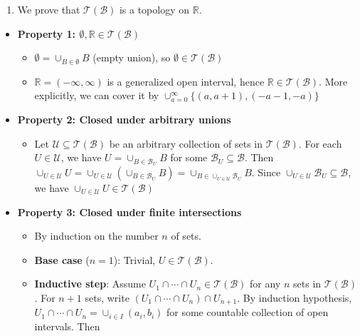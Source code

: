 \documentclass[a4paper,11pt,oneside]{book}
\begin{document}
\begin{mystsolution}\begin{enumerate}
\item We prove that $\mathcal{T}(\mathcal{B})$ is a topology on $\mathbb{R}$.
\end{enumerate}

\begin{itemize}
\item \textbf{Property 1: $\emptyset, \mathbb{R} \in \mathcal{T}(\mathcal{B})$}

\begin{itemize}
\item $\emptyset = \cup_{B \in \emptyset} B$ (empty union), so $\emptyset \in \mathcal{T}(\mathcal{B})$
\item $\mathbb{R} = ( -\infty, \infty)$ is a generalized open interval, hence $\mathbb{R} \in \mathcal{T}(\mathcal{B})$. More explicitly, we can cover it by $\cup_{a=0}^{\infty} \{(a,a+1),( -a -1, -a)\}$
\end{itemize}


\item \textbf{Property 2: Closed under arbitrary unions}

\begin{itemize}
\item Let $\mathcal{U} \subseteq \mathcal{T}(\mathcal{B})$ be an arbitrary collection of sets in $\mathcal{T}(\mathcal{B})$. For each $U \in \mathcal{U}$, we have $U = \cup_{B \in \mathcal{B}_U} B$ for some $\mathcal{B}_U \subseteq \mathcal{B}$. Then $\cup_{U \in \mathcal{U}} U = \cup_{U \in \mathcal{U}} \left(\cup_{B \in \mathcal{B}_U} B\right) = \cup_{B \in \cup_{U \in \mathcal{U}} \mathcal{B}_U} B$. Since $\cup_{U \in \mathcal{U}} \mathcal{B}_U \subseteq \mathcal{B}$, we have $\cup_{U \in \mathcal{U}} U \in \mathcal{T}(\mathcal{B})$
\end{itemize}


\item \textbf{Property 3: Closed under finite intersections}

\begin{itemize}
\item By induction on the number $n$ of sets.
\item \textbf{Base case} ($n=1$): Trivial, $U \in \mathcal{T}(\mathcal{B})$.
\item \textbf{Inductive step}: Assume $U_1 \cap \cdots \cap U_n \in \mathcal{T}(\mathcal{B})$ for any $n$ sets in $\mathcal{T}(\mathcal{B})$.
For $n+1$ sets, write $(U_1 \cap \cdots \cap U_n) \cap U_{n+1}$. By induction hypothesis, $U_1 \cap \cdots \cap U_n = \cup_{i \in I}(a_i, b_i)$
for some countable collection of open intervals. Then


\end{itemize}
\end{itemize}
\end{mystsolution}
\end{document}

